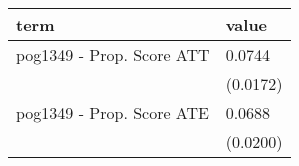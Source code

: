 
\begin{tabular}{ll}
\toprule
term & value\\
\midrule
pog1349 - Prop. Score ATT & 0.0744\\
 & (0.0172)\\
pog1349 - Prop. Score ATE & 0.0688\\
 & (0.0200)\\
\bottomrule
\end{tabular}

